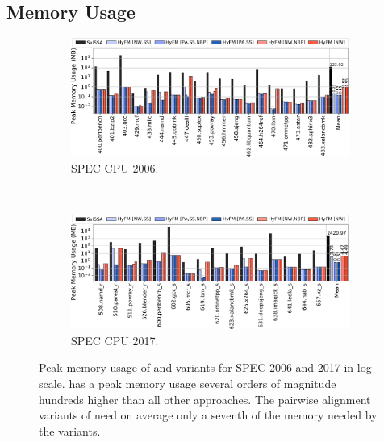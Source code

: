 
\subsection{Memory Usage} \label{sec:eval:memory}

 \begin{figure}[h]
   \centering
 \begin{subfigure}{\textwidth}
 \center
   \includegraphics[width=\textwidth]{src/lctes21/figs/memory-spec06.pdf}
 \caption{SPEC CPU 2006.}
 \label{fig:memory-spec06}
 \end{subfigure}
 \\
 \begin{subfigure}{\textwidth}
 \center
   \includegraphics[width=\textwidth]{src/lctes21/figs/memory-spec17.pdf}
 \caption{SPEC CPU 2017.}
 \label{fig:memory-spec17}
 \end{subfigure}
 \caption{Peak memory usage of {\SOAName} and {\ProjName} variants for SPEC 2006 and 2017 in log scale. {\SOAName} has a peak memory usage several orders of magnitude hundreds higher than all other approaches. The pairwise alignment variants of {\ProjName} need on average only a seventh of the memory needed by the {\NW} variants.}
  \label{fig:memory-both}
 \end{figure}

